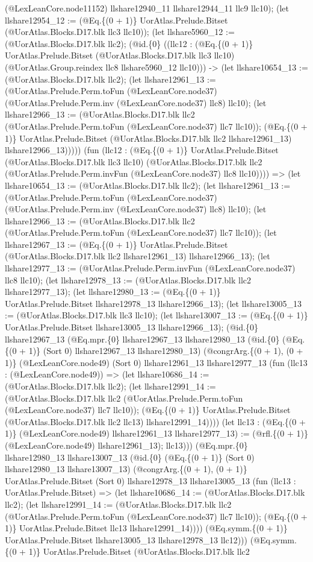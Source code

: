 \documentclass[11pt]{article}
\begin{document}
(@LexLeanCore.node11152) llshare12940\_11 llshare12944\_11 llc9 llc10); (let llshare12954\_12 := (@Eq.\{(0 + 1)\} UorAtlas.Prelude.Bitset (@UorAtlas.Blocks.D17.blk llc3 llc10)); (let llshare5960\_12 := (@UorAtlas.Blocks.D17.blk llc2); (@id.\{0\} ((llc12 : (@Eq.\{(0 + 1)\} UorAtlas.Prelude.Bitset (@UorAtlas.Blocks.D17.blk llc3 llc10) (@UorAtlas.Group.reindex llc8 llshare5960\_12 llc10))) -> (let llshare10654\_13 := (@UorAtlas.Blocks.D17.blk llc2); (let llshare12961\_13 := (@UorAtlas.Prelude.Perm.toFun (@LexLeanCore.node37) (@UorAtlas.Prelude.Perm.inv (@LexLeanCore.node37) llc8) llc10); (let llshare12966\_13 := (@UorAtlas.Blocks.D17.blk llc2 (@UorAtlas.Prelude.Perm.toFun (@LexLeanCore.node37) llc7 llc10)); (@Eq.\{(0 + 1)\} UorAtlas.Prelude.Bitset (@UorAtlas.Blocks.D17.blk llc2 llshare12961\_13) llshare12966\_13))))) (fun (llc12 : (@Eq.\{(0 + 1)\} UorAtlas.Prelude.Bitset (@UorAtlas.Blocks.D17.blk llc3 llc10) (@UorAtlas.Blocks.D17.blk llc2 (@UorAtlas.Prelude.Perm.invFun (@LexLeanCore.node37) llc8 llc10)))) => (let llshare10654\_13 := (@UorAtlas.Blocks.D17.blk llc2); (let llshare12961\_13 := (@UorAtlas.Prelude.Perm.toFun (@LexLeanCore.node37) (@UorAtlas.Prelude.Perm.inv (@LexLeanCore.node37) llc8) llc10); (let llshare12966\_13 := (@UorAtlas.Blocks.D17.blk llc2 (@UorAtlas.Prelude.Perm.toFun (@LexLeanCore.node37) llc7 llc10)); (let llshare12967\_13 := (@Eq.\{(0 + 1)\} UorAtlas.Prelude.Bitset (@UorAtlas.Blocks.D17.blk llc2 llshare12961\_13) llshare12966\_13); (let llshare12977\_13 := (@UorAtlas.Prelude.Perm.invFun (@LexLeanCore.node37) llc8 llc10); (let llshare12978\_13 := (@UorAtlas.Blocks.D17.blk llc2 llshare12977\_13); (let llshare12980\_13 := (@Eq.\{(0 + 1)\} UorAtlas.Prelude.Bitset llshare12978\_13 llshare12966\_13); (let llshare13005\_13 := (@UorAtlas.Blocks.D17.blk llc3 llc10); (let llshare13007\_13 := (@Eq.\{(0 + 1)\} UorAtlas.Prelude.Bitset llshare13005\_13 llshare12966\_13); (@id.\{0\} llshare12967\_13 (@Eq.mpr.\{0\} llshare12967\_13 llshare12980\_13 (@id.\{0\} (@Eq.\{(0 + 1)\} (Sort 0) llshare12967\_13 llshare12980\_13) (@congrArg.\{(0 + 1), (0 + 1)\} (@LexLeanCore.node49) (Sort 0) llshare12961\_13 llshare12977\_13 (fun (llc13 : (@LexLeanCore.node49)) => (let llshare10686\_14 := (@UorAtlas.Blocks.D17.blk llc2); (let llshare12991\_14 := (@UorAtlas.Blocks.D17.blk llc2 (@UorAtlas.Prelude.Perm.toFun (@LexLeanCore.node37) llc7 llc10)); (@Eq.\{(0 + 1)\} UorAtlas.Prelude.Bitset (@UorAtlas.Blocks.D17.blk llc2 llc13) llshare12991\_14)))) (let llc13 : (@Eq.\{(0 + 1)\} (@LexLeanCore.node49) llshare12961\_13 llshare12977\_13) := (@rfl.\{(0 + 1)\} (@LexLeanCore.node49) llshare12961\_13); llc13))) (@Eq.mpr.\{0\} llshare12980\_13 llshare13007\_13 (@id.\{0\} (@Eq.\{(0 + 1)\} (Sort 0) llshare12980\_13 llshare13007\_13) (@congrArg.\{(0 + 1), (0 + 1)\} UorAtlas.Prelude.Bitset (Sort 0) llshare12978\_13 llshare13005\_13 (fun (llc13 : UorAtlas.Prelude.Bitset) => (let llshare10686\_14 := (@UorAtlas.Blocks.D17.blk llc2); (let llshare12991\_14 := (@UorAtlas.Blocks.D17.blk llc2 (@UorAtlas.Prelude.Perm.toFun (@LexLeanCore.node37) llc7 llc10)); (@Eq.\{(0 + 1)\} UorAtlas.Prelude.Bitset llc13 llshare12991\_14)))) (@Eq.symm.\{(0 + 1)\} UorAtlas.Prelude.Bitset llshare13005\_13 llshare12978\_13 llc12))) (@Eq.symm.\{(0 + 1)\} UorAtlas.Prelude.Bitset (@UorAtlas.Blocks.D17.blk llc2 
\end{document}
